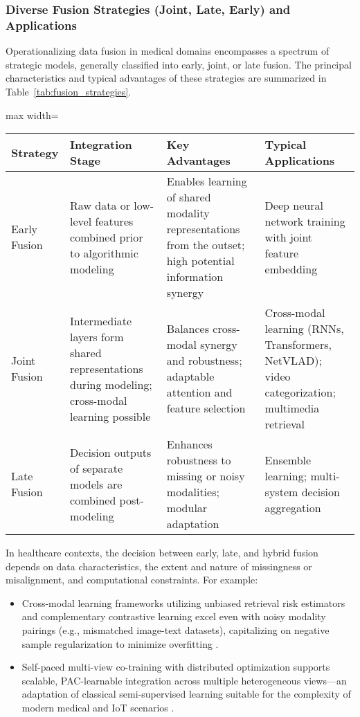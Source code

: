 \subsubsection{Diverse Fusion Strategies (Joint, Late, Early) and Applications}

Operationalizing data fusion in medical domains encompasses a spectrum of strategic models, generally classified into early, joint, or late fusion. The principal characteristics and typical advantages of these strategies are summarized in Table~\ref{tab:fusion_strategies}.

\begin{table*}[htbp]
\centering
\caption{Comparison of Fusion Strategies in Multimodal Medical Analytics}
\label{tab:fusion_strategies}
\begin{adjustbox}{max width=\textwidth}
\begin{tabular}{llll}
\toprule
\textbf{Strategy} & \textbf{Integration Stage} & \textbf{Key Advantages} & \textbf{Typical Applications} \\
\midrule
Early Fusion & Raw data or low-level features combined prior to algorithmic modeling & Enables learning of shared modality representations from the outset; high potential information synergy & Deep neural network training with joint feature embedding \\
Joint Fusion & Intermediate layers form shared representations during modeling; cross-modal learning possible & Balances cross-modal synergy and robustness; adaptable attention and feature selection & Cross-modal learning (RNNs, Transformers, NetVLAD); video categorization; multimedia retrieval \\
Late Fusion & Decision outputs of separate models are combined post-modeling & Enhances robustness to missing or noisy modalities; modular adaptation & Ensemble learning; multi-system decision aggregation \\
\bottomrule
\end{tabular}
\end{adjustbox}
\end{table*}

In healthcare contexts, the decision between early, late, and hybrid fusion depends on data characteristics, the extent and nature of missingness or misalignment, and computational constraints. For example:
\begin{itemize}
    \item Cross-modal learning frameworks utilizing unbiased retrieval risk estimators and complementary contrastive learning excel even with noisy modality pairings (e.g., mismatched image-text datasets), capitalizing on negative sample regularization to minimize overfitting \cite{ref64,ref61}.
    \item Self-paced multi-view co-training with distributed optimization supports scalable, PAC-learnable integration across multiple heterogeneous views—an adaptation of classical semi-supervised learning suitable for the complexity of modern medical and IoT scenarios \cite{ref54,ref60,ref62}.
\end{itemize}

